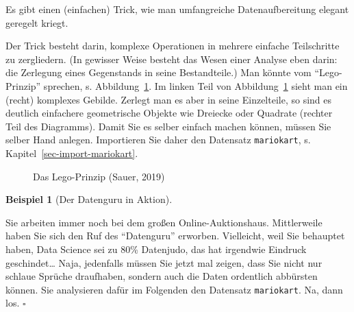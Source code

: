 \documentclass[
  letterpaper,
  twoside,
  open=any]{scrbook}
\theoremstyle{definition}
\theoremstyle{definition}
\theoremstyle{definition}
\newtheorem{example}{Beispiel}[chapter]
\theoremstyle{remark}
\begin{document}
Es gibt einen (einfachen) Trick, wie man umfangreiche Datenaufbereitung
elegant geregelt kriegt.

Der Trick besteht darin, komplexe Operationen in mehrere einfache
Teilschritte zu zergliedern. (In gewisser Weise besteht das Wesen einer
Analyse eben darin: die Zerlegung eines Gegenstands in seine
Bestandteile.) Man könnte vom \enquote{Lego-Prinzip} sprechen, s.
Abbildung~\ref{fig-lego}. Im linken Teil von Abbildung~\ref{fig-lego}
sieht man ein (recht) komplexes Gebilde. Zerlegt man es aber in seine
Einzelteile, so sind es deutlich einfachere geometrische Objekte wie
Dreiecke oder Quadrate (rechter Teil des Diagramms). Damit Sie es selber
einfach machen können, müssen Sie selber Hand anlegen. Importieren Sie
daher den Datensatz \texttt{mariokart}, s.
Kapitel~\ref{sec-import-mariokart}.

\begin{figure}


\caption{\label{fig-lego}Das Lego-Prinzip (Sauer, 2019)}

\end{figure}%

\begin{example}[Der Datenguru in
Aktion]\protect\hypertarget{exm-datenjudo}{}\label{exm-datenjudo}

Sie arbeiten immer noch bei dem großen Online-Auktionshaus. Mittlerweile
haben Sie sich den Ruf des \enquote{Datenguru} erworben. Vielleicht,
weil Sie behauptet haben, Data Science sei zu 80\% Datenjudo, das hat
irgendwie Eindruck geschindet\ldots{} Naja, jedenfalls müssen Sie jetzt
mal zeigen, dass Sie nicht nur schlaue Sprüche draufhaben, sondern auch
die Daten ordentlich abbürsten können. Sie analysieren dafür im
Folgenden den Datensatz \texttt{mariokart}. Na, dann los. \(\square\)

\end{example}
\end{document}
